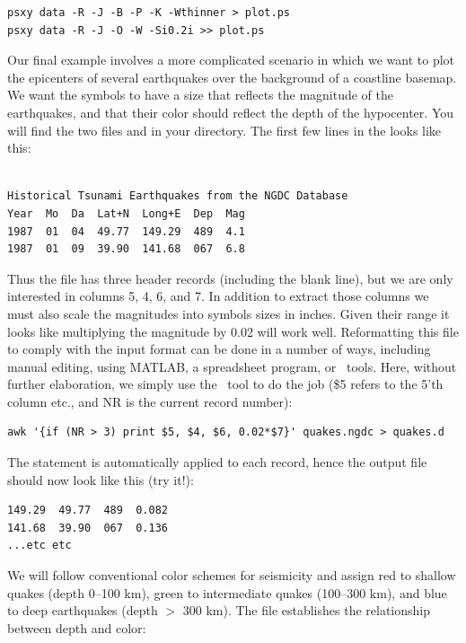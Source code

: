 \documentclass{report}
\begin{document}
{\small\begin{verbatim} 
psxy data -R -J -B -P -K -Wthinner > plot.ps
psxy data -R -J -O -W -Si0.2i >> plot.ps
\end{verbatim}
}

Our final  example involves a more complicated scenario
in which we want to plot the epicenters of several earthquakes over
the background of a coastline basemap.  We want the symbols to have a
size that reflects the magnitude of the earthquakes, and that their
color should reflect the depth of the hypocenter.  You will find the
two files  and  in your
directory.  The first few lines in the  looks
like this:\par 

{\small\begin{verbatim}

Historical Tsunami Earthquakes from the NGDC Database
Year  Mo  Da  Lat+N  Long+E  Dep  Mag
1987  01  04  49.77  149.29  489  4.1
1987  01  09  39.90  141.68  067  6.8
\end{verbatim}
}

Thus the file has three header records (including the blank line),
but we are only interested in columns 5, 4, 6, and 7.  In addition to
extract those columns we must also scale the magnitudes into symbols
sizes in inches.  Given their range it looks like multiplying the
magnitude by 0.02 will work well.  Reformatting this file to comply
with the  input format can be done in a number of ways,
including manual editing, using MATLAB, a spreadsheet program, or \UNIX\
tools.  Here, without further elaboration, we simply use the \UNIX\ tool
\progname{awk} to do the job (\$5 refers to the 5'th column etc., and NR
is the current record number):

{\small\begin{verbatim}
awk '{if (NR > 3) print $5, $4, $6, 0.02*$7}' quakes.ngdc > quakes.d
\end{verbatim}
}

The  statement is automatically applied to each record,
hence the output file \filename{quakes.d} should now look like this (try it!):

{\small\begin{verbatim}
149.29  49.77  489  0.082
141.68  39.90  067  0.136
...etc etc
\end{verbatim}
}

We will follow conventional color schemes for seismicity and assign red
to shallow quakes (depth 0--100 km), green to intermediate quakes
(100--300 km), and blue to deep earthquakes (depth $>$ 300 km).  The
\filename{quakes.cpt} file establishes the relationship between depth
and color:
\end{document}
